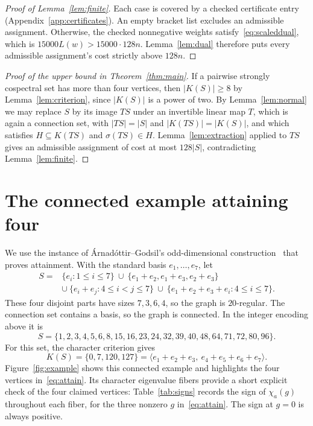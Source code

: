 \documentclass[11pt]{article}
\theoremstyle{definition}
\begin{document}
\begin{proof}[Proof of Lemma~\ref{lem:finite}]
Each case is covered by a checked certificate entry
(Appendix~\ref{app:certificates}). An empty bracket list excludes
an admissible assignment. Otherwise, the checked nonnegative weights
satisfy~\eqref{eq:scaleddual}, which is $15000L(w)>15000\cdot128n$.
Lemma~\ref{lem:dual} therefore puts every admissible assignment's cost
strictly above $128n$.
\end{proof}

\begin{proof}[Proof of the upper bound in Theorem~\ref{thm:main}]
If a pairwise strongly cospectral set has more than four vertices,
then $|K(S)|\geq8$ by Lemma~\ref{lem:criterion}, since $|K(S)|$ is a
power of two. By Lemma~\ref{lem:normal} we may replace $S$ by its image $TS$
under an invertible linear map $T$,
which is again a connection set, with $|TS|=|S|$ and
$|K(TS)|=|K(S)|$, and which satisfies $H\subseteq K(TS)$ and
$\sigma(TS)\in H$. Lemma~\ref{lem:extraction} applied to $TS$ gives an
admissible assignment of cost at most $128|S|$, contradicting
Lemma~\ref{lem:finite}.
\end{proof}

\section{The connected example attaining four}\label{sec:example}
We use the instance of
\'Arnad\'ottir--Godsil's odd-dimensional construction~\cite[Theorem~10.2]{AG}
that proves attainment. With the standard basis $e_1,\ldots,e_7$, let
\begin{align*}
 S={}&\{e_i:1\leq i\leq7\}
 \ \cup\ \{e_1+e_2,e_1+e_3,e_2+e_3\}\\
 &\cup\ \{e_i+e_j:4\leq i<j\leq7\}
 \ \cup\ \{e_1+e_2+e_3+e_i:4\leq i\leq7\}.
\end{align*}
These four disjoint parts have sizes $7,3,6,4$, so the graph is
$20$-regular. The connection set contains a basis, so the graph is
connected. In the integer encoding above it is
\[
 S=\{1,2,3,4,5,6,8,15,16,23,24,32,39,40,48,64,71,72,80,96\}.
\]
For this set, the character criterion gives
\begin{equation}\label{eq:attain}
 K(S)=\{0,7,120,127\}
   =\langle e_1+e_2+e_3,\ e_4+e_5+e_6+e_7\rangle.
\end{equation}
Figure~\ref{fig:example} shows this connected example and highlights
the four vertices in~\eqref{eq:attain}.
Its character eigenvalue fibers provide a short explicit check of the
four claimed vertices: Table~\ref{tab:signs} records the sign of $\chi_a(g)$
throughout each fiber, for the three nonzero $g$ in~\eqref{eq:attain}.
The sign at $g=0$ is always positive.
\end{document}
